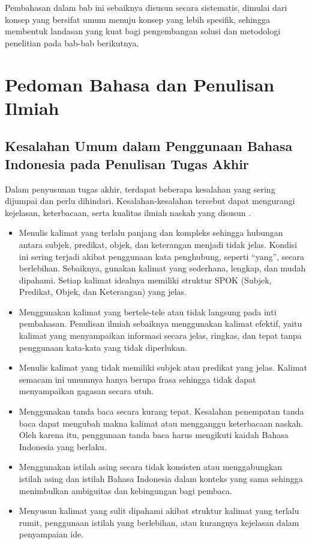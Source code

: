 Pembahasan dalam bab ini sebaiknya disusun secara sistematis, dimulai dari konsep yang bersifat umum menuju konsep yang lebih spesifik, sehingga membentuk landasan yang kuat bagi pengembangan solusi dan metodologi penelitian pada bab-bab berikutnya.

\section{Pedoman Bahasa dan Penulisan Ilmiah}
\subsection{Kesalahan Umum dalam Penggunaan Bahasa Indonesia pada Penulisan Tugas Akhir}

Dalam penyusunan tugas akhir, terdapat beberapa kesalahan yang sering dijumpai dan perlu dihindari. Kesalahan-kesalahan tersebut dapat mengurangi kejelasan, keterbacaan, serta kualitas ilmiah naskah yang disusun \cite{PUEBI2022, ArifinTasai2014}.

\begin{itemize}[topsep=0pt,itemsep=0pt,parsep=0pt,leftmargin=*]
\item Menulis kalimat yang terlalu panjang dan kompleks sehingga hubungan antara subjek, predikat, objek, dan keterangan menjadi tidak jelas. Kondisi ini sering terjadi akibat penggunaan kata penghubung, seperti “yang”, secara berlebihan. Sebaiknya, gunakan kalimat yang sederhana, lengkap, dan mudah dipahami. Setiap kalimat idealnya memiliki struktur SPOK (Subjek, Predikat, Objek, dan Keterangan) yang jelas.

\item Menggunakan kalimat yang bertele-tele atau tidak langsung pada inti pembahasan. Penulisan ilmiah sebaiknya menggunakan kalimat efektif, yaitu kalimat yang menyampaikan informasi secara jelas, ringkas, dan tepat tanpa penggunaan kata-kata yang tidak diperlukan.

\item Menulis kalimat yang tidak memiliki subjek atau predikat yang jelas. Kalimat semacam ini umumnya hanya berupa frasa sehingga tidak dapat menyampaikan gagasan secara utuh.

\item Menggunakan tanda baca secara kurang tepat. Kesalahan penempatan tanda baca dapat mengubah makna kalimat atau mengganggu keterbacaan naskah. Oleh karena itu, penggunaan tanda baca harus mengikuti kaidah Bahasa Indonesia yang berlaku.

\item Menggunakan istilah asing secara tidak konsisten atau menggabungkan istilah asing dan istilah Bahasa Indonesia dalam konteks yang sama sehingga menimbulkan ambiguitas dan kebingungan bagi pembaca.

\item Menyusun kalimat yang sulit dipahami akibat struktur kalimat yang terlalu rumit, penggunaan istilah yang berlebihan, atau kurangnya kejelasan dalam penyampaian ide.
\end{itemize}

